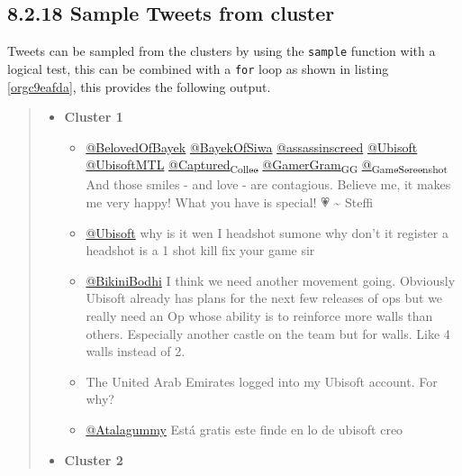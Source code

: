 \documentclass[11pt]{article}
\begin{document}
\subsection{8.2.18 Sample Tweets from cluster}
\label{sec:org4e6e64b}
Tweets can be sampled from the clusters by using the \texttt{sample} function with a logical test, this can be combined with a \texttt{for} loop as shown in listing \ref{orgc9eafda}, this provides the following output.


\begin{quote}
\begin{itemize}
\item \textbf{Cluster 1}
\begin{itemize}
\item \href{https://twitter.com/search?q=\%40BelovedOfBayek\&src=typed\_query}{@BelovedOfBayek}
 \href{https://twitter.com/search?q=\%40BayekOfSiwa\&src=typed\_query}{@BayekOfSiwa} \href{https://twitter.com/search?q=\%40assassinscreed\&src=typed\_query}{@assassinscreed} \href{https://twitter.com/search?q=\%40Ubisoft\&src=typed\_query}{@Ubisoft} \href{https://twitter.com/search?q=\%40UbisoftMTL\&src=typed\_query}{@UbisoftMTL}
\href{https://twitter.com/search?q=\%40Captured\_Collec\&src=typed\_query}{@Captured\textsubscript{Collec}} \href{https://twitter.com/search?q=\%40GamerGram\_GG\&src=typed\_query}{@GamerGram\textsubscript{GG}} \href{https://twitter.com/search?q=\%40\_GameScreenshot\&src=typed\_query}{@\textsubscript{GameScreenshot}} And those smiles - and
love - are contagious. Believe me, it makes me very happy! What you have is
special! 💗 \textasciitilde{} Steffi
\item \href{https://twitter.com/search?q=\%40Ubisoft}{@Ubisoft} why is it wen I headshot sumone why don’t it register a headshot
is a 1 shot kill fix your game sir
\item \href{https://twitter.com/search?q=\%40BikiniBodhi}{@BikiniBodhi} I think we need another movement going. Obviously Ubisoft
already has plans for the next few releases of ops but we really need an Op
whose ability is to reinforce more walls than others. Especially another
castle on the team but for walls. Like 4 walls instead of 2.
\item The United Arab Emirates logged into my Ubisoft account. For why?
\item \href{https://twitter.com/search?q=\%40Atalagummy}{@Atalagummy} Está gratis este finde en lo de ubisoft creo
\end{itemize}
\item \textbf{Cluster 2}

\end{itemize}
\end{quote}
\end{document}
